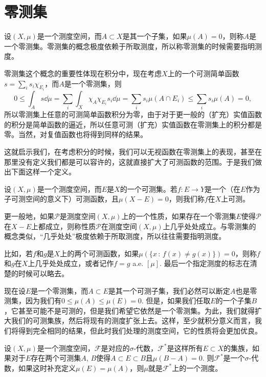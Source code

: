 \section{零测集}

设$(X,\mu)$是一个测度空间，而$A\subset X$是其一个子集，如果$\mu(A)=0$，则称$A$是一个零测集。零测集的概念极度依赖于所取测度，所以称零测集的时候需要指明测度。

零测集这个概念的重要性体现在积分中，现在考虑$X$上的一个可测简单函数$s=\sum_i s_i\chi_{E_i}$，而$A$是一个零测集，则
\[
	0\leq \int_A s\dd\mu= \sum_i \int_X \chi_A \chi_{E_i} s_i\dd\mu= \sum_i s_i \mu(A\cap E_i)\leq \sum_i s_i\mu(A)=0,
\]
所以零测集上任意的可测简单函数积分为零，由于对于更一般的（扩充）实值函数的积分是简单函数的逼近，所以任意可测（扩充）实值函数在零测集上的积分都是零。当然，对复值函数也将得到同样的结果。

这就启示我们，在考虑积分的时候，我们可以无视函数在零测集上的表现，甚至在那里没有定义我们都是可以容许的，这就直接扩大了可测函数的范围。于是我们做出下面这样一个定义。

\begin{para}
设$(X,\mu)$是一个测度空间，而$E$是$X$的一个可测集。若$f:E\to Y$是一个（在$E$作为子可测空间的意义下）可测函数，且$\mu(X-E)=0$，则我们称$f$在$X$上可测。
\end{para}

更一般地，如果$\mathcal{P}$是测度空间$(X,\mu)$上的一个性质，如果存在一个零测集$E$使得$\mathcal{P}$在$X-E$上都成立，则称性质$\mathcal{P}$在测度空间$(X,\mu)$上几乎处处成立。与零测集的概念类似，“几乎处处”极度依赖于所取测度，所以往往需要指明测度。

比如，若$f$和$g$是$X$上的两个可测函数，如果$\mu\left(\{x\,:\, f(x)\neq g(x)\}\right)=0$，则称$f$和$g$在$X$上几乎处处成立，或者记作$f=g$ a.e. $[\mu]$. 最后一个指定测度的标志在清楚的时候可以略去。

\begin{para}
现在设$E$是一个零测集，而$A\subset E$是其一个可测子集，我们必然可以断定$A$也是零测集，因为我们有$0\leq \mu(A)\leq \mu(E)=0$. 但是，如果我们任取$E$的一个子集$B$，它甚至可能不是可测的，但是我们希望它依然是一个零测集。为此，我们就得扩大我们的可测集族，然后将现有的测度扩张上去。这样，至少就积分意义而言，我们将得到完全相同的结果，但此时我们处理的测度空间，它的性质将会更加优良。
\end{para}

\begin{pro}
设$(X,\mu)$是一个测度空间，$\mathcal{F}$是对应的$\sigma$-代数，$\mathcal{F}^*$是这样所有$E\subset X$的集族，如果对于$E$存在两个可测集$A$, $B$使得$A\subset E\subset B$且$\mu(B-A)=0$. 则$\mathcal{F}^*$是一个$\sigma$-代数，如果这时补充定义$\mu(E)=\mu(A)$，则$\mu$就是$\mathcal{F}^*$上的一个测度。
\end{pro}

